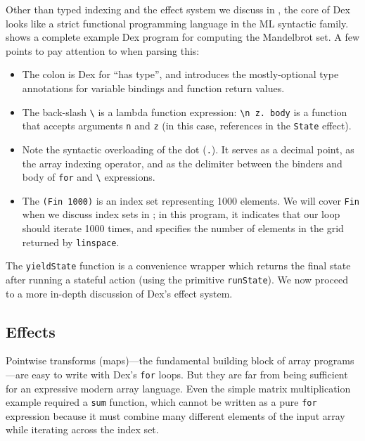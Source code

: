 \documentclass[acmsmall,screen,nonacm]{acmart}
\newcommand{\ttt}[1]{\texttt{#1}}
\begin{document}
Other than typed indexing and the effect system we discuss in , the core of Dex looks like a strict functional programming language in the ML \citep{milner1997ml} syntactic family.
 shows a complete example Dex program for computing the Mandelbrot set.
A few points to pay attention to when parsing this:
\begin{itemize}
\item The colon \text{:} is Dex for ``has type'', and introduces the mostly-optional type annotations for variable bindings and function return values.
\item The back-slash \verb|\| is a lambda function expression: \verb|\n z. body| is a function that accepts arguments \texttt{n} and \texttt{z} (in this case, references in the \texttt{State} effect).
\item Note the syntactic overloading of the dot (\texttt{.}). It serves as a decimal point, as the array indexing operator, and as the delimiter between the binders and body of \texttt{for} and \verb|\| expressions.
\item The \texttt{(Fin 1000)} is an index set representing 1000 elements.  We will cover \texttt{Fin} when we discuss index sets in ; in this program, it indicates that our loop should iterate 1000 times, and specifies the number of elements in the grid returned by \texttt{linspace}.
\end{itemize}

The \ttt{yieldState} function is a convenience wrapper which returns the final state after running a stateful action (using the primitive \ttt{runState}).
We now proceed to a more in-depth discussion of Dex's effect system.


\subsection{Effects}
\label{sec:effects}

Pointwise transforms (maps)---the fundamental building block of array programs---are easy to write with Dex's \texttt{for} loops.
But they are far from being sufficient for an expressive modern array language.
Even the simple matrix multiplication example required a \texttt{sum} function, which cannot be written as a pure \texttt{for} expression because it must combine many different elements of the input array while iterating across the index set.
\end{document}
